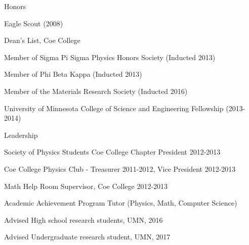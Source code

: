 \documentclass{resume} %
\begin{document}

\begin{rSection}{Honors}

\item Eagle Scout (2008)
\item Dean's List, Coe College
\item Member of Sigma Pi Sigma Physics Honors Society (Inducted 2013)
\item Member of Phi Beta Kappa (Inducted 2013)
\item Member of the Materials Research Society (Inducted 2016)
\item University of Minnesota College of Science and Engineering Fellowship (2013-2014)

\end{rSection}



\begin{rSection}{Leadership}

\item  Society of Physics Students Coe College Chapter President 2012-2013
\item  Coe College Physics Club - Treasurer 2011-2012, Vice President 2012-2013
\item Math Help Room Supervisor, Coe College 2012-2013
\item Academic Achievement Program Tutor (Physics, Math, Computer Science)
\item Advised High school research students, UMN, 2016
\item Advised Undergraduate research student, UMN, 2017

\end{rSection}









\end{document}
